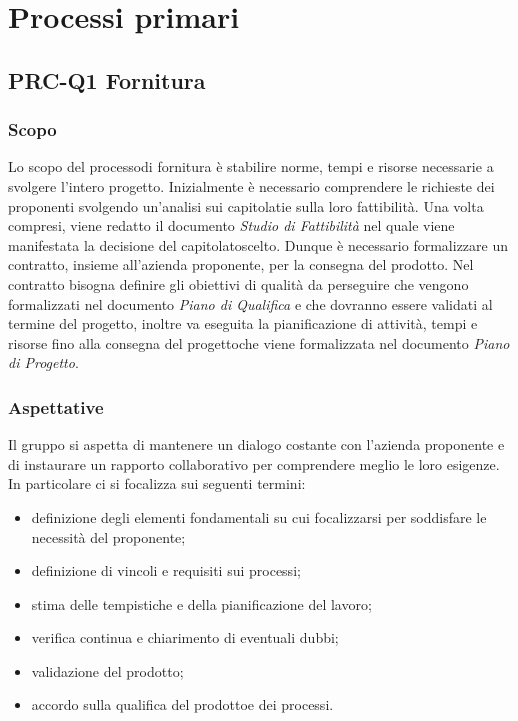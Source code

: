 \section{Processi primari}
	\subsection{PRC-Q1 Fornitura}
		\subsubsection{Scopo}
		Lo scopo del processo\glosp di fornitura è stabilire norme, tempi e risorse necessarie a svolgere l'intero progetto\glo.
		Inizialmente è necessario comprendere le richieste dei proponenti svolgendo un'analisi sui capitolati\glo e sulla loro fattibilità. Una volta compresi, viene redatto il documento \textit{Studio di Fattibilità} nel quale viene manifestata la decisione del capitolato\glosp scelto.
		Dunque è necessario formalizzare un contratto, insieme all'azienda proponente, per la consegna del prodotto\glo. Nel contratto bisogna definire gli obiettivi di qualità da perseguire che vengono formalizzati nel documento \textit{Piano di Qualifica} e che dovranno essere validati al termine del progetto, inoltre va eseguita la pianificazione di attività, tempi e risorse fino alla consegna del progetto\glosp che viene formalizzata nel documento \textit{Piano di Progetto}.
		\subsubsection{Aspettative}
		Il gruppo si aspetta di mantenere un dialogo costante con l'azienda proponente e di instaurare un rapporto collaborativo per comprendere meglio le loro esigenze. In particolare ci si focalizza sui seguenti termini:
		\begin{itemize}
			\item definizione degli elementi fondamentali su cui focalizzarsi per soddisfare le necessità del proponente;
			\item definizione di vincoli e requisiti sui processi\glo;
			\item stima delle tempistiche e della pianificazione del lavoro;
			\item verifica continua e chiarimento di eventuali dubbi;
			\item validazione del prodotto\glo;
			\item accordo sulla qualifica del prodotto\glosp e dei processi\glo.
		\end{itemize}
